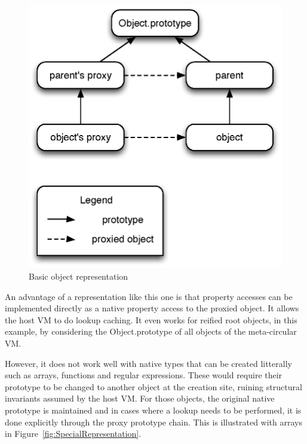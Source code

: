 \begin{figure}[htb]
\begin{center}
\includegraphics[scale=0.75]{figures/objectRepresentation}
\caption{\label{fig:BasicRepresentation} Basic object representation}
\end{center}
\end{figure}

An advantage of a representation like this one is that property accesses can be
implemented directly as a native property access to the proxied object. It
allows the host VM to do lookup caching. It even works for reified root
objects, in this example, by considering  the {Object.prototype} of
all objects of the meta-circular VM.

However, it does not work well with native types that can be created litterally
such as arrays, functions and regular expressions. These would require their
prototype to be changed to another object at the creation site, ruining
structural invariants assumed by the host VM. For those objects, the original
native prototype is maintained and in cases where a lookup needs to be
performed, it is done explicitly through the proxy prototype chain. This is
illustrated with arrays in Figure~\ref{fig:SpecialRepresentation}.

